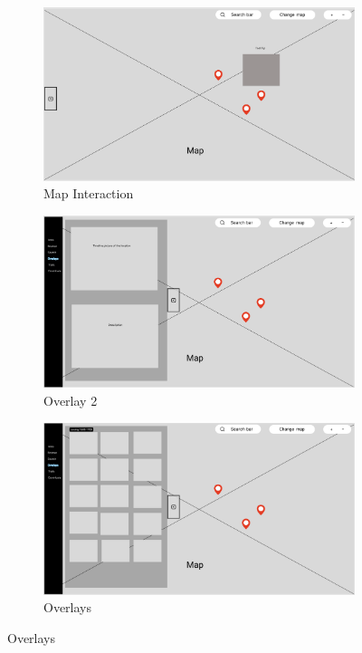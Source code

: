 \begin{figure}[H]
  \vspace{0.5cm}

  \begin{subfigure}[b]{0.3\textwidth}
    \includegraphics[width=\textwidth]{screenshot/wireframe_map_interaction.png}
    \caption{Map Interaction}
  \end{subfigure}\hfill
  \begin{subfigure}[b]{0.3\textwidth}
    \includegraphics[width=\textwidth]{screenshot/wireframe_overlay2.png}
    \caption{Overlay 2}
  \end{subfigure}\hfill
  \begin{subfigure}[b]{0.3\textwidth}
    \includegraphics[width=\textwidth]{screenshot/wireframe_overlays.png}
    \caption{Overlays}
  \end{subfigure}


\end{figure}
